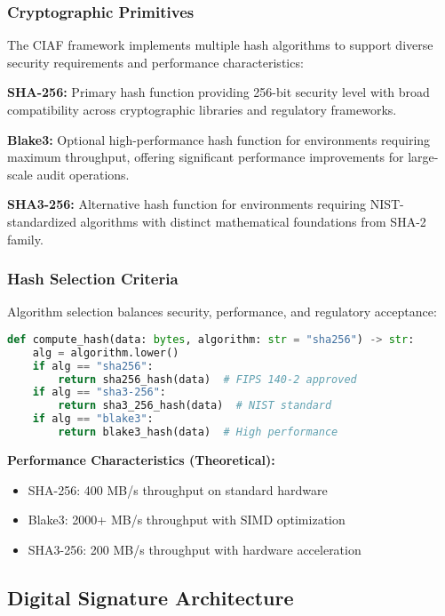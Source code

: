 \documentclass[12pt,a4paper]{article}
\begin{document}
\subsubsection{Cryptographic Primitives}

The CIAF framework implements multiple hash algorithms to support diverse security requirements and performance characteristics:

\textbf{SHA-256:} Primary hash function providing 256-bit security level with broad compatibility across cryptographic libraries and regulatory frameworks.

\textbf{Blake3:} Optional high-performance hash function for environments requiring maximum throughput, offering significant performance improvements for large-scale audit operations.

\textbf{SHA3-256:} Alternative hash function for environments requiring NIST-standardized algorithms with distinct mathematical foundations from SHA-2 family.

\subsubsection{Hash Selection Criteria}

Algorithm selection balances security, performance, and regulatory acceptance:

\begin{lstlisting}[language=Python, caption=Hash Function Selection]
def compute_hash(data: bytes, algorithm: str = "sha256") -> str:
    alg = algorithm.lower()
    if alg == "sha256":
        return sha256_hash(data)  # FIPS 140-2 approved
    if alg == "sha3-256":
        return sha3_256_hash(data)  # NIST standard
    if alg == "blake3":
        return blake3_hash(data)  # High performance
\end{lstlisting}

\textbf{Performance Characteristics (Theoretical):}
\begin{itemize}
\item SHA-256: 400 MB/s throughput on standard hardware
\item Blake3: 2000+ MB/s throughput with SIMD optimization
\item SHA3-256: 200 MB/s throughput with hardware acceleration
\end{itemize}

\subsection{Digital Signature Architecture}
\end{document}
